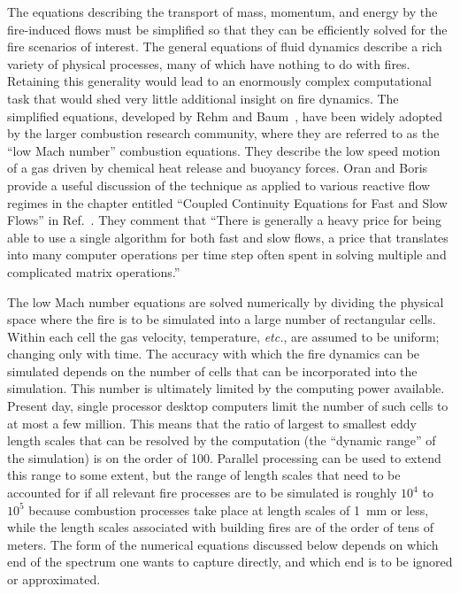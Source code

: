 \documentclass[11pt]{book}
\begin{document}
The equations describing the transport of mass, momentum, and energy by the fire-induced flows must
be simplified so that they can be efficiently solved for the fire scenarios of interest.
The general equations of fluid dynamics describe a rich variety of physical processes,
many of which have nothing to do with fires. Retaining this generality would lead to an
enormously complex computational task that would shed very little additional insight on fire dynamics.
The simplified equations, developed by Rehm and Baum~\cite{Rehm:1}, have been widely adopted
by the larger combustion research community, where they are referred to as the ``low Mach number''
combustion equations. They describe the low speed motion of a gas driven by chemical heat release and buoyancy forces.
Oran and Boris provide a useful discussion of the technique as applied to various reactive flow regimes in the chapter
entitled ``Coupled Continuity Equations for Fast and Slow Flows'' in Ref.~\cite{Oran:1}.
They comment that ``There is generally a heavy price for being able to use a single algorithm for both
fast and slow flows, a price that translates into many computer operations per time step often spent in
solving multiple and complicated matrix operations.''

The low Mach number equations are solved numerically by dividing the physical space where
the fire is to be simulated into a large number of rectangular cells. Within each cell the gas
velocity, temperature, {\em etc.}, are assumed to be uniform; changing only with time.
The accuracy with which the fire dynamics can be simulated depends on the number of cells
that can be incorporated into the simulation. This number is ultimately limited
by the computing power available. Present day, single processor desktop computers limit the number of
such cells to at most a few million. This means that the ratio of largest to smallest eddy length
scales that can be resolved by the computation (the ``dynamic range'' of the simulation) is on the order of 100.
Parallel processing can be used to extend this range to some extent, but
the range of length scales that need to be accounted for if all relevant
fire processes are to be simulated is roughly $10^4$ to $10^5$ because combustion processes take place at
length scales of 1~mm or less, while the length scales associated with building fires are of the order of
tens of meters. The form of the numerical equations discussed below depends on which end of the
spectrum one wants to capture directly, and which end is to be ignored or approximated.
\end{document}

